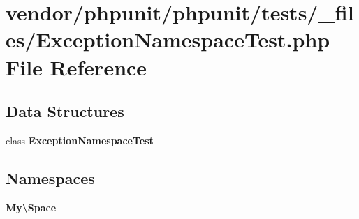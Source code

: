 \section{vendor/phpunit/phpunit/tests/\+\_\+files/\+Exception\+Namespace\+Test.php File Reference}
\label{_exception_namespace_test_8php}
\subsection*{Data Structures}
\begin{DoxyCompactItemize}
\item 
class {\bf Exception\+Namespace\+Test}
\end{DoxyCompactItemize}
\subsection*{Namespaces}
\begin{DoxyCompactItemize}
\item 
 {\bf My\textbackslash{}\+Space}
\end{DoxyCompactItemize}
